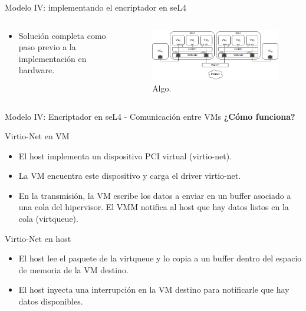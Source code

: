 \documentclass[serif, aspectratio=169]{beamer}
\begin{document}
\begin{frame}{Modelo IV: implementando el encriptador en seL4}
    \begin{columns}
        \begin{column}{0.4\textwidth}
            \begin{itemize}
                \item Solución completa como paso previo a la implementación en hardware.
        
            \end{itemize}
        \end{column}
        \begin{column}{0.6\textwidth}
            \begin{figure}
                \centering
                \includegraphics[width=\textwidth]{images/3_model4.png}
                \caption{Algo.}
            \end{figure}
        \end{column}
    \end{columns}
\end{frame}

\begin{frame}{Modelo IV: Encriptador en seL4 - Comunicación entre VMs}
\textbf{¿Cómo funciona?}
\begin{block}{\small Virtio-Net en VM}

\begin{itemize}
    \item El host implementa un dispositivo PCI virtual (virtio-net).
    \item La VM encuentra este dispositivo y carga el driver virtio-net.
    \item En la transmisión, la VM escribe los datos a enviar en un buffer asociado a una cola del hipervisor. El VMM notifica al host que hay datos listos en la cola (virtqueue).
\end{itemize}
\end{block}

\begin{block}{\small Virtio-Net en host}
\begin{itemize}
    \item El host lee el paquete de la virtqueue y lo copia a un buffer dentro del espacio de memoria de la VM destino.
    \item El host inyecta una interrupción en la VM destino para notificarle que hay datos disponibles.
\end{itemize}
\end{block}



\end{frame}
\end{document}
